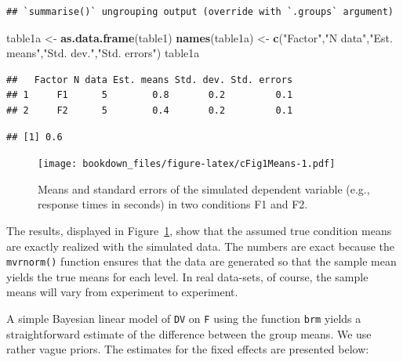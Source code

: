 \documentclass[12pt,]{krantz}
\newenvironment{Shaded}{\begin{snugshade}}{\end{snugshade}}
\newcommand{\KeywordTok}[1]{\textcolor[rgb]{0.13,0.29,0.53}{\textbf{#1}}}
\newcommand{\StringTok}[1]{\textcolor[rgb]{0.31,0.60,0.02}{#1}}
\newcommand{\CommentTok}[1]{\textcolor[rgb]{0.56,0.35,0.01}{\textit{#1}}}
\newcommand{\OperatorTok}[1]{\textcolor[rgb]{0.81,0.36,0.00}{\textbf{#1}}}
\newcommand{\NormalTok}[1]{#1}
\theoremstyle{definition}
\theoremstyle{definition}
\theoremstyle{definition}
\theoremstyle{remark}
\begin{document}
\begin{verbatim}
## `summarise()` ungrouping output (override with `.groups` argument)
\end{verbatim}

\begin{Shaded}
\begin{Highlighting}[]
\NormalTok{table1a <-}\StringTok{ }\KeywordTok{as.data.frame}\NormalTok{(table1)}
\KeywordTok{names}\NormalTok{(table1a) <-}\StringTok{ }\KeywordTok{c}\NormalTok{(}\StringTok{"Factor"}\NormalTok{,}\StringTok{"N data"}\NormalTok{,}\StringTok{"Est. means"}\NormalTok{,}\StringTok{"Std. dev."}\NormalTok{,}\StringTok{"Std. errors"}\NormalTok{)}
\NormalTok{table1a}
\end{Highlighting}
\end{Shaded}

\begin{verbatim}
##   Factor N data Est. means Std. dev. Std. errors
## 1     F1      5        0.8       0.2         0.1
## 2     F2      5        0.4       0.2         0.1
\end{verbatim}

\begin{Shaded}
\end{Shaded}

\begin{verbatim}
## [1] 0.6
\end{verbatim}

\begin{figure}
\centering
\texttt{[image: bookdown\_files/figure-latex/cFig1Means-1.pdf]}
\caption{\label{fig:cFig1Means}Means and standard errors of the simulated
dependent variable (e.g., response times in seconds) in two conditions
F1 and F2.}
\end{figure}

The results, displayed in Figure~\ref{fig:cFig1Means}, show that the
assumed true condition means are exactly realized with the simulated
data. The numbers are exact because the \texttt{mvrnorm()} function
ensures that the data are generated so that the sample mean yields the
true means for each level. In real data-sets, of course, the sample
means will vary from experiment to experiment.

A simple Bayesian linear model of \texttt{DV} on \texttt{F} using the
function \texttt{brm} yields a straightforward estimate of the
difference between the group means. We use rather vague priors. The
estimates for the fixed effects are presented below:
\end{document}

